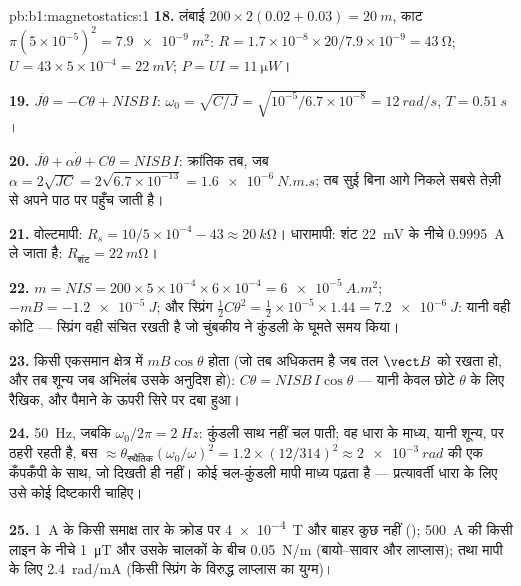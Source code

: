 \begin{solution}{pb:b1:magnetostatics:1}
\textbf{18.} लंबाई $200 \times 2(0.02 + 0.03) = \qty{20}{m}$, काट $\pi(5 \times
10^{-5})^2 = \qty{7.9e-9}{m^2}$: $R = 1.7 \times 10^{-8} \times 20/7.9 \times 10^{-9} =
\qty{43}{\ohm}$; $U = 43 \times 5 \times 10^{-4} = \qty{22}{mV}$; $P = UI = \qty{11}{\micro W}$।

\textbf{19.} $J\ddot\theta = -C\theta + NISB\,I$: $\omega_0 = \sqrt{C/J} = \sqrt{10^{-5}/6.7
\times 10^{-8}} = \qty{12}{rad/s}$, $T = \qty{0.51}{s}$।

\textbf{20.} $J\ddot\theta + \alpha\dot\theta + C\theta = NISB\,I$: क्रांतिक तब, जब
$\alpha = 2\sqrt{JC} = 2\sqrt{6.7 \times 10^{-13}} = \qty{1.6e-6}{N.m.s}$; तब सुई
बिना आगे निकले सबसे तेज़ी से अपने पाठ पर पहुँच जाती है।

\textbf{21.} वोल्टमापी: $R_s = 10/5 \times 10^{-4} - 43 \approx \qty{20}{k\ohm}$।
धारामापी: शंट \qty{22}{mV} के नीचे \qty{0.9995}{A} ले जाता है: $R_{\text{शंट}} =
\qty{22}{m\ohm}$।

\textbf{22.} $m = NIS = 200 \times 5 \times 10^{-4} \times 6 \times 10^{-4} = \qty{6e-5}{A.m^2}$;
$-mB = \qty{-1.2e-5}{J}$; और स्प्रिंग $\tfrac12C\theta^2 = \tfrac12 \times 10^{-5} \times 1.44 =
\qty{7.2e-6}{J}$: यानी वही कोटि --- स्प्रिंग वही संचित रखती है जो चुंबकीय
 ने कुंडली के घूमते समय किया।

\textbf{23.} किसी एकसमान क्षेत्र में  $mB\cos\theta$ होता (जो तब
अधिकतम है जब तल $\vect B$ को रखता हो, और तब शून्य जब अभिलंब उसके अनुदिश हो): $C\theta =
NISB\,I\cos\theta$ --- यानी केवल छोटे $\theta$ के लिए रैखिक, और पैमाने के
ऊपरी सिरे पर दबा हुआ।

\textbf{24.} \qty{50}{Hz}, जबकि $\omega_0/2\pi = \qty{2}{Hz}$: कुंडली साथ नहीं
चल पाती; वह धारा के माध्य, यानी शून्य, पर ठहरी रहती है, बस
$\approx \theta_{\text{स्थैतिक}}(\omega_0/\omega)^2 = 1.2 \times (12/314)^2 \approx
\qty{2e-3}{rad}$  की एक कँपकँपी के साथ, जो दिखती ही नहीं। कोई चल-कुंडली
मापी माध्य पढ़ता है --- प्रत्यावर्ती धारा के लिए उसे कोई दिष्टकारी चाहिए।

\textbf{25.} \qty{1}{A} के किसी समाक्ष तार के क्रोड पर \qty{4e-4}{T} और बाहर
कुछ नहीं (); \qty{500}{A} की किसी लाइन के नीचे \qty{1}{\micro T}
और उसके चालकों के बीच \qty{0.05}{N/m} (बायो--सावार और लाप्लास); तथा मापी के
लिए \qty{2.4}{rad/mA} (किसी स्प्रिंग के विरुद्ध लाप्लास का युग्म)।
\end{solution}
